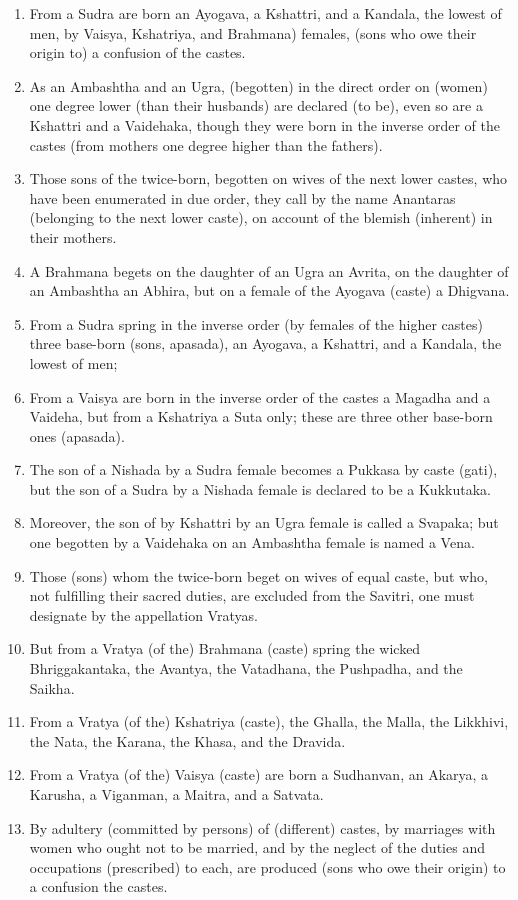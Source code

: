 \begin{enumerate}
\item From a Sudra are born an Ayogava, a Kshattri, and a Kandala, the lowest of men, by Vaisya, Kshatriya, and Brahmana) females, (sons who owe their origin to) a confusion of the castes.
\item As an Ambashtha and an Ugra, (begotten) in the direct order on (women) one degree lower (than their husbands) are declared (to be), even so are a Kshattri and a Vaidehaka, though they were born in the inverse order of the castes (from mothers one degree higher than the fathers).
\item Those sons of the twice-born, begotten on wives of the next lower castes, who have been enumerated in due order, they call by the name Anantaras (belonging to the next lower caste), on account of the blemish (inherent) in their mothers.
\item A Brahmana begets on the daughter of an Ugra an Avrita, on the daughter of an Ambashtha an Abhira, but on a female of the Ayogava (caste) a Dhigvana.
\item From a Sudra spring in the inverse order (by females of the higher castes) three base-born (sons, apasada), an Ayogava, a Kshattri, and a Kandala, the lowest of men;
\item From a Vaisya are born in the inverse order of the castes a Magadha and a Vaideha, but from a Kshatriya a Suta only; these are three other base-born ones (apasada).
\item The son of a Nishada by a Sudra female becomes a Pukkasa by caste (gati), but the son of a Sudra by a Nishada female is declared to be a Kukkutaka.
\item Moreover, the son of by Kshattri by an Ugra female is called a Svapaka; but one begotten by a Vaidehaka on an Ambashtha female is named a Vena.
\item Those (sons) whom the twice-born beget on wives of equal caste, but who, not fulfilling their sacred duties, are excluded from the Savitri, one must designate by the appellation Vratyas.
\item But from a Vratya (of the) Brahmana (caste) spring the wicked Bhriggakantaka, the Avantya, the Vatadhana, the Pushpadha, and the Saikha.
\item From a Vratya (of the) Kshatriya (caste), the Ghalla, the Malla, the Likkhivi, the Nata, the Karana, the Khasa, and the Dravida.
\item From a Vratya (of the) Vaisya (caste) are born a Sudhanvan, an Akarya, a Karusha, a Viganman, a Maitra, and a Satvata.
\item By adultery (committed by persons) of (different) castes, by marriages with women who ought not to be married, and by the neglect of the duties and occupations (prescribed) to each, are produced (sons who owe their origin) to a confusion the castes.

\end{enumerate}
